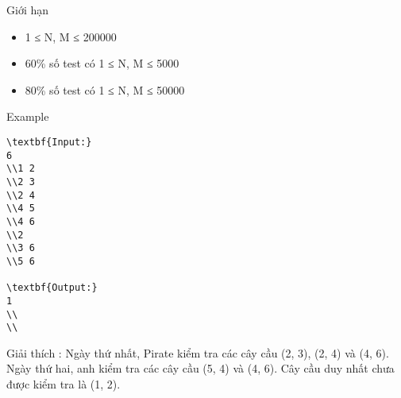 Giới hạn  
\begin{itemize}
	\item     1 ≤ N, M ≤ 200000   
	\item     60\% số test có 1 ≤ N, M ≤ 5000   
	\item     80\% số test có 1 ≤ N, M ≤ 50000   
\end{itemize}
   Example  
\begin{verbatim}
\textbf{Input:}
6
\\1 2
\\2 3
\\2 4
\\4 5
\\4 6
\\2
\\3 6
\\5 6

\textbf{Output:}
1
\\
\\\end{verbatim}

Giải thích        : Ngày thứ nhất, Pirate kiểm tra các cây cầu (2, 3), (2, 4) và (4, 6). Ngày thứ hai, anh kiểm tra các cây cầu (5, 4) và (4, 6). Cây cầu duy nhất chưa được kiểm tra là (1, 2).